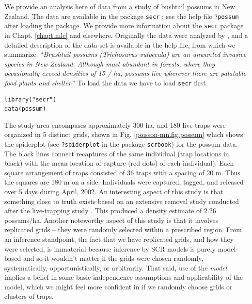 We provide an analysis here of data from a study of bushtail possums
in New Zealand. The data are available in the \R package \mbox{\tt secr}
\citep{efford_etal:2009euring}; 
see the help file \mbox{\tt ?possum} after loading the \secr package.
We provide more information about the \mbox{\tt secr} package in
Chapt. \ref{chapt.mle} and elsewhere.
Originally the data were analyzed by \citet{efford_etal:2005}, and 
a detailed description of the data set is available in the help file,
from which we summarize:
``{\it Brushtail possums (Trichosurus vulpecula) are an unwanted invasive
species in New Zealand. Although most abundant in forests, where they
occasionally exceed densities of 15 / ha, possums live wherever there
are palatable food plants and shelter}.''
To load the data we have to load \mbox{\tt secr} first
\begin{verbatim}
library("secr")
data(possum)
\end{verbatim}
The study area encompases approximately 300 ha, and 180 live traps
were 
organized in 5 distinct grids, shown in  Fig. \ref{poisson-mn.fig.possum}
which shows the spiderplot (see \mbox{\tt ?spiderplot} in the \R
package \mbox{\tt scrbook}) for the possum data. The black lines
connect recaptures of the same individual (trap locations in black)
with the mean location of capture (red dots) of each individual).
Each square arrangement of traps consisted of 
36 traps with a spacing of 20 m. Thus the squares are 180 m on a
side. 
Individuals were captured, tagged, and released over 5 days during
April, 2002. An interesting aspect of this study is that something
close to truth exists based on an extensive removal study
conducted after the live-trapping study \citep{Efford_etal:2005}. This
produced a density estimate of 2.26 possums/ha.  Another noteworthy
aspect of this study is that it involves
replicated grids -- they were randomly selected within a prescribed
region.
From an inference standpoint, the fact that we have replicated grids,
and how they were selected, is
immaterial because inference by SCR models is purely
model-based and so it wouldn't matter if the grids were chosen
randomly, systematically, opportunistically, or arbitrarily. That
said, use of the {\it model} implies a belief in some basic
independence 
assumptions and applicability of the model, which we might 
feel more confident in if we randomly choose grids or clusters of traps.
